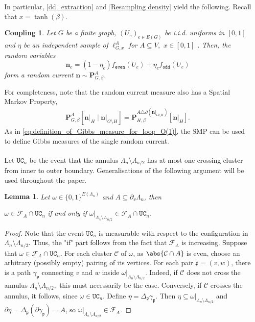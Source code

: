 \documentclass[article,11pt,reqno]{amsart}
\newcommand{\Prbcur}{\mathbf{P}}
\newcommand{\nn}{\mathbf{n}}
\newtheorem{lemma}[theorem]{Lemma}
\newtheorem{coupling}[theorem]{Coupling}
\begin{document}
In particular, \eqref{dd_extraction} and \eqref{Resampling density} yield the following. Recall that $x=\tanh(\beta)$.
\begin{coupling} \label{Loop_to_curren_sampling}
Let $G$ be a finite graph,   $(U_e)_{e\in E(G)}$ be i.i.d. uniforms in $[0,1]$ and $\eta$ be an independent sample of $\ell^A_{G,x}$ for $A\subseteq V,$ $x\in [0,1]$ . Then,  the random variables
$$
\mathbf{n}_e=(1-\eta_e)f_{\mathtt{even}}(U_e)+\eta_e f_{\mathtt{odd}}(U_e)
$$
form a random current $\mathbf{n}\sim \mathbf{P}^A_{G,\beta}$.
\end{coupling}
For completeness, note that the random current measure also has a Spatial Markov Property,
\begin{align}\label{eq:random_current_SMP}
\Prbcur^{A}_{G,\beta}[\nn\vert_H\mid \nn\vert_{G\setminus H}]=\Prbcur_{H,\beta}^{A\triangle\partial (\nn\vert_{G\setminus H})}[\nn\vert_H]. \tag{SMP Current}
\end{align}
As in \eqref{eq:definition_of_Gibbs_measure_for_loop_O(1)}, the SMP can be used to define Gibbs measures of the single random current. 
\\
\\
Let  $\mathtt{UC}_n$ be the event that the annulus $\Lambda_n \setminus \Lambda_{n/2}$ has at most one crossing cluster from inner to outer boundary.
Generalisations of the following argument will be used throughout the paper.  
\begin{lemma}\label{lemma:FAevent_and_unique_crossings}
Let $\omega \in \{0,1\}^{E(\Lambda_n)}$ and $A\subseteq \partial_v \Lambda_n$, then
\begin{center}
$\omega \in \mathcal{F}_A \cap \mathtt{UC}_n$ if and only if $\omega\vert_{\Lambda_n \setminus \Lambda_{n/2}} \in \mathcal{F}_A \cap \mathtt{UC}_n$. 
\end{center}
\end{lemma}
\begin{proof} Note that the event $\mathtt{UC}_n$ is measurable with respect to the configuration in $\Lambda_{n}\setminus \Lambda_{n/2}$.
 Thus, the "if" part follows from the fact that $\mathcal{F}_A$ is increasing. 
 Suppose that $\omega \in \mathcal{F}_A \cap \mathtt{UC}_n$. For each cluster $\mathcal{C}$ of $\omega$, as $\abs{\mathcal{C} \cap A}$ is even, choose an arbitrary (possibly empty) pairing of its vertices. For each pair $\mathfrak{p}=(v,w)$, there is a path $\gamma_{\mathfrak{p}}$ connecting $v$ and $w$  inside $\omega\vert_{\Lambda_n \setminus \Lambda_{n/2}}$. 
Indeed, if $\mathcal{C}$ does not cross the annulus $\Lambda_n \setminus \Lambda_{n/2},$ this must necessarily be the case. Conversely, if $\mathcal{C}$ crosses the annulus, it follows, since $\omega \in \mathtt{UC}_n$. 
 Define $\eta=\Delta_{\mathfrak{p}} \gamma_{\mathfrak{p}}$. Then $\eta \subseteq \omega\vert_{\Lambda_n \setminus \Lambda_{n/2}}$ and $\partial \eta = \Delta_{\mathfrak{p}} (\partial \gamma_{\mathfrak{p}})= A$, so $\omega\vert_{\Lambda_n \setminus \Lambda_{n/2}} \in \mathcal{F}_A$.
\end{proof}
\end{document}
